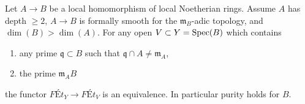 \begin{proposition}
\label{proposition-purity-smooth-over-depth2}
Let $A \to B$ be a local homomorphism of local Noetherian rings.
Assume $A$ has depth $\geq 2$, $A \to B$ is formally smooth for the
$\mathfrak m_B$-adic topology, and $\dim(B) > \dim(A)$. For any open
$V \subset Y = \mathop{\mathrm{Spec}}(B)$ which contains
\begin{enumerate}
\item any prime $\mathfrak q \subset B$ such that
$\mathfrak q \cap A \not = \mathfrak m_A$,
\item the prime $\mathfrak m_A B$
\end{enumerate}
the functor $\textit{F\'Et}_Y \to \textit{F\'Et}_V$
is an equivalence. In particular purity holds for $B$.
\end{proposition}

